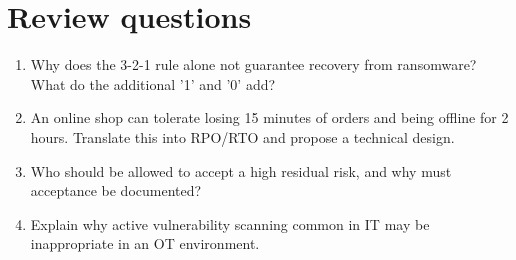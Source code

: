 \documentclass[11pt,openany]{book}
\begin{document}
\section*{Review questions}
\begin{enumerate}
  \item Why does the 3-2-1 rule alone not guarantee recovery from ransomware? What do the additional '1' and '0' add?
  \item An online shop can tolerate losing 15 minutes of orders and being offline for 2 hours. Translate this into RPO/RTO and propose a technical design.
  \item Who should be allowed to accept a high residual risk, and why must acceptance be documented?
  \item Explain why active vulnerability scanning common in IT may be inappropriate in an OT environment.
\end{enumerate}
\end{document}
